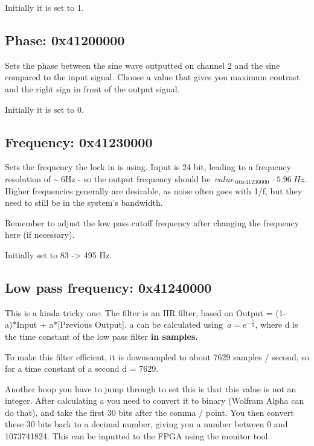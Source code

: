 \documentclass[10pt]{article}
\begin{document}
Initially it is set to 1.

\par\null

\subsection*{Phase: 0x41200000}

{\label{418763}}

Sets the phase between the sine wave outputted on channel 2 and the sine
compared to the input signal. Choose a value that gives you maximum
contrast and the right sign in front of the output signal.

Initially it is set to 0.

\par\null

\subsection*{Frequency: 0x41230000}

{\label{994635}}

Sets the frequency the lock in is using. Input is 24 bit, leading to a
frequency resolution of \textasciitilde{} 6Hz - so the output frequency
should be~\(value_{@0x41230000}\ \cdot5.96\ Hz\). Higher frequencies generally are
desirable, as noise often goes with 1/f, but they need to still be in
the system's bandwidth.

Remember to adjust the low pass cutoff frequency after changing the
frequency here (if necessary).

Initially set to 83 -\textgreater{} 495 Hz.

\par\null

\subsection*{Low pass frequency:
0x41240000}

{\label{219234}}

This is a kinda tricky one: The filter is an IIR filter, based on Output
= (1-a)*Input + a*{[}Previous Output{]}. a can be calculated
using~\(a=e^{-\frac{1}{d}}\), where d is the time constant of the low pass
filter \textbf{in samples.}

To make this filter efficient, it is downsampled to about 7629 samples /
second, so for a time constant of a second d = 7629.

Another hoop you have to jump through to set this is that this value is
not an integer. After calculating a you need to convert it to binary
(Wolfram Alpha can do that), and take the first 30 bits after the comma
/ point. You then convert these 30 bits back to a decimal number, giving
you a number between 0 and 1073741824. This can be inputted to the FPGA
using the monitor tool.
\end{document}
